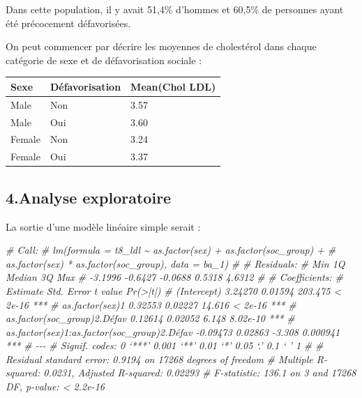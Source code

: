 \documentclass[
]{book}
\newenvironment{Shaded}{\begin{snugshade}}{\end{snugshade}}
\newcommand{\CommentTok}[1]{\textcolor[rgb]{0.56,0.35,0.01}{\textit{#1}}}
\begin{document}
Dans cette population, il y avait 51,4\% d'hommes et 60,5\% de personnes ayant été précocement défavorisées.

On peut commencer par décrire les moyennes de cholestérol dans chaque catégorie de sexe et de défavorisation sociale :

\begin{table}
\centering
\begin{tabular}[t]{l|l|l}
\hline
Sexe & Défavorisation & Mean(Chol LDL)\\
\hline
Male & Non & 3.57\\
\hline
Male & Oui & 3.60\\
\hline
Female & Non & 3.24\\
\hline
Female & Oui & 3.37\\
\hline
\end{tabular}
\end{table}

\hypertarget{analyse-exploratoire}{%
\subsection*{4.Analyse exploratoire}\label{analyse-exploratoire}}

La sortie d'une modèle linéaire simple serait :

\begin{Shaded}
\begin{Highlighting}[]
\CommentTok{\# Call:}
\CommentTok{\# lm(formula = t8\_ldl \textasciitilde{} as.factor(sex) + as.factor(soc\_group) + }
\CommentTok{\#     as.factor(sex) * as.factor(soc\_group), data = ba\_1)}
\CommentTok{\# }
\CommentTok{\# Residuals:}
\CommentTok{\#     Min      1Q  Median      3Q     Max }
\CommentTok{\# {-}3.1996 {-}0.6427 {-}0.0688  0.5318  4.6312 }
\CommentTok{\# }
\CommentTok{\# Coefficients:}
\CommentTok{\#                                             Estimate Std. Error t value Pr(\textgreater{}|t|)    }
\CommentTok{\# (Intercept)                                  3.24270    0.01594 203.475  \textless{} 2e{-}16 ***}
\CommentTok{\# as.factor(sex)1                              0.32553    0.02227  14.616  \textless{} 2e{-}16 ***}
\CommentTok{\# as.factor(soc\_group)2.Défav                  0.12614    0.02052   6.148 8.02e{-}10 ***}
\CommentTok{\# as.factor(sex)1:as.factor(soc\_group)2.Défav {-}0.09473    0.02863  {-}3.308 0.000941 ***}
\CommentTok{\# {-}{-}{-}}
\CommentTok{\# Signif. codes:  0 ‘***’ 0.001 ‘**’ 0.01 ‘*’ 0.05 ‘.’ 0.1 ‘ ’ 1}
\CommentTok{\# }
\CommentTok{\# Residual standard error: 0.9194 on 17268 degrees of freedom}
\CommentTok{\# Multiple R{-}squared:  0.0231,  Adjusted R{-}squared:  0.02293 }
\CommentTok{\# F{-}statistic: 136.1 on 3 and 17268 DF,  p{-}value: \textless{} 2.2e{-}16}
\end{Highlighting}
\end{Shaded}
\end{document}
